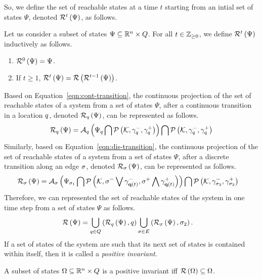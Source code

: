 %
So, we define the set of reachable states at a time $t$ starting from an intial
set of states $\Psi$, denoted $\mathcal{R}^{t}\left(\Psi\right)$, as
follows.
%
\begin{definition}
Let us consider a subset of states
$\Psi\subseteq\mathbb{R}^n\times Q$.  For all $t\in\mathbb{Z}_{\geq
0}$, we define $\mathcal{R}^{t}\left(\Psi\right)$ inductively as follows.
%
\begin{enumerate}
\item $\mathcal{R}^{0}\left(\Psi\right)=\Psi$.
\item If $t\geq 1$, $\mathcal{R}^{t}\left(\Psi\right)=\mathcal{R}\left(\mathcal{R}^{t-1}\left(\Psi\right)\right)$.
\end{enumerate}
%
\end{definition}
%
Based on Equation~\ref{eqn:cont-transition}, the continuous projection
of the set of reachable states of a system from a set of
states $\Psi$, after a continuous transition in a location $q$,
denoted $\mathcal{R}_{q}\left(\Psi\right)$, can be represented as follows.
%
\begin{align*}
&
\mathcal{R}_{q}\left(\Psi\right)=\mathcal{A}_q\left(\Psi_q\bigcap{\mathcal{P}\left(\mathcal{K},\gamma_q^-,\gamma_q^+\right)}\right)\bigcap
\mathcal{P}\left(\mathcal{K},\gamma_q^-,\gamma_q^+\right)\\
\end{align*}
%
Similarly, based on Equation~\ref{eqn:dis-transition}, the continuous
projection of the set of reachable states of a system from a set of
states $\Psi$, after a discrete transition along an edge $\sigma$,
denoted $\mathcal{R}_{\sigma}\left(\Psi\right)$, can be represented as follows.
%
\begin{align*}
&
\mathcal{R}_{\sigma}\left(\Psi\right)=\mathcal{A}_\sigma\left(\Psi_{\sigma_1}\bigcap\mathcal{P}\left(\mathcal{K},\sigma^-\bigvee \gamma_{{\bf q}\left(t\right)}^-,\sigma^+\bigwedge \gamma_{{\bf q}\left(t\right)}^+\right)\right)\bigcap 
\mathcal{P}\left(\mathcal{K},\gamma_{\sigma_2}^-,\gamma_{\sigma_2}^+\right)
\end{align*}
%
Therefore, we can represented the set of reachable states of the
system in one time step from a set of states $\Psi$ as follows.
%
\begin{align*}
& \mathcal{R}\left(\Psi\right)=\bigcup_{q\in Q}\left(\mathcal{R}_{q}\left(\Psi\right),q\right)\bigcup_{\sigma\in E}\left(\mathcal{R}_{\sigma}\left(\Psi\right),\sigma_2\right).
\end{align*}
%
If a set of states of the system are such that its next set of states
is contained within itself, then it is called a {\it positive invariant}.
%
\begin{definition}
A subset of states $\Omega\subseteq\mathbb{R}^n\times Q$ is a
positive invariant iff $\mathcal{R}\left(\Omega\right)\subseteq\Omega$.
\end{definition}
